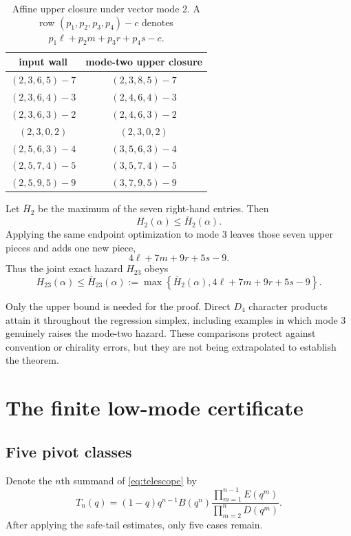 \documentclass[11pt,a4paper]{article}
\theoremstyle{definition}
\begin{document}
\begin{table}[ht]
\centering
\caption{Affine upper closure under vector mode 2.  A row
$(p_1,p_2,p_3,p_4)-c$ denotes
$p_1\ell+p_2m+p_3r+p_4s-c$.}
\label{tab:mode-two}
\begin{tabular}{cc}
\toprule
input wall & mode-two upper closure \\
\midrule
$(2,3,6,5)-7$ & $(2,3,8,5)-7$ \\
$(2,3,6,4)-3$ & $(2,4,6,4)-3$ \\
$(2,3,6,3)-2$ & $(2,4,6,3)-2$ \\
$(2,3,0,2)$   & $(2,3,0,2)$ \\
$(2,5,6,3)-4$ & $(3,5,6,3)-4$ \\
$(2,5,7,4)-5$ & $(3,5,7,4)-5$ \\
$(2,5,9,5)-9$ & $(3,7,9,5)-9$ \\
\bottomrule
\end{tabular}
\end{table}

Let $\overline H_2$ be the maximum of the seven right-hand entries.  Then
\[
   H_2(\alpha)\leq\overline H_2(\alpha).
\]
Applying the same endpoint optimization to mode 3 leaves those seven upper
pieces and adds one new piece,
\[
   4\ell+7m+9r+5s-9.
\]
Thus the joint exact hazard $H_{23}$ obeys
\begin{equation}
\label{eq:joint-hazard}
 H_{23}(\alpha)\leq
 \overline H_{23}(\alpha)
 :=\max\left\{
 \overline H_2(\alpha),
 4\ell+7m+9r+5s-9
 \right\}.
\end{equation}

Only the upper bound is needed for the proof.  Direct $D_4$ character
products attain it throughout the regression simplex, including examples in
which mode 3 genuinely raises the mode-two hazard.  These comparisons protect
against convention or chirality errors, but they are not being extrapolated
to establish the theorem.

\section{The finite low-mode certificate}

\subsection{Five pivot classes}

Denote the $n$th summand of \eqref{eq:telescope} by
\[
 T_n(q)=(1-q)q^{n-1}B(q^n)
 \frac{\prod_{m=1}^{n-1}E(q^m)}
      {\prod_{m=2}^{n}D(q^m)}.
\]
After applying the safe-tail estimates, only five cases remain.
\end{document}
